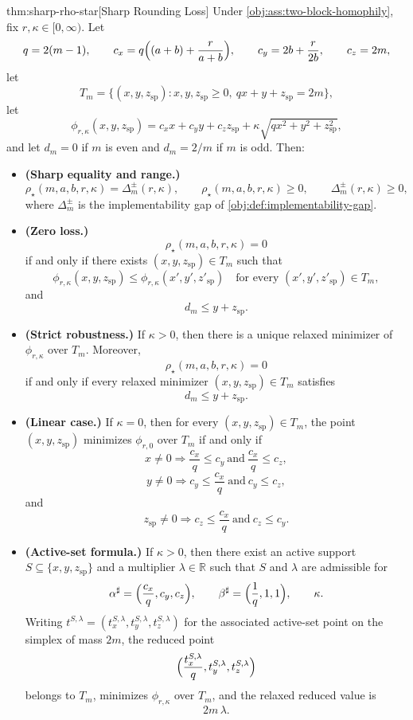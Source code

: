 \begin{theoremv}{thm:sharp-rho-star}[Sharp Rounding Loss]
Under \cref{obj:ass:two-block-homophily}, fix $r,\kappa\in[0,\infty)$.  Let
\[
q=2(m-1),\qquad
c_x=q\Bigl((a+b)+\frac{r}{a+b}\Bigr),\qquad
c_y=2b+\frac{r}{2b},\qquad
c_z=2m,
\]
let
\[
T_m=\{(x,y,z_{\mathrm{sp}}):x,y,z_{\mathrm{sp}}\ge0,\ qx+y+z_{\mathrm{sp}}=2m\},
\]
let
\[
\phi_{r,\kappa}(x,y,z_{\mathrm{sp}})
=c_xx+c_yy+c_zz_{\mathrm{sp}}
+\kappa\sqrt{qx^2+y^2+z_{\mathrm{sp}}^2},
\]
and let $d_m=0$ if $m$ is even and $d_m=2/m$ if $m$ is odd.  Then:
\begin{itemize}
\item \textbf{(Sharp equality and range.)}
\[
\rho_\star(m,a,b,r,\kappa)=\Delta_m^{\pm}(r,\kappa),
\qquad
\rho_\star(m,a,b,r,\kappa)\ge0,
\qquad
\Delta_m^{\pm}(r,\kappa)\ge0,
\]
where $\Delta_m^{\pm}$ is the implementability gap of \cref{obj:def:implementability-gap}.

\item \textbf{(Zero loss.)}
\[
\rho_\star(m,a,b,r,\kappa)=0
\]
if and only if there exists $(x,y,z_{\mathrm{sp}})\in T_m$ such that
\[
\phi_{r,\kappa}(x,y,z_{\mathrm{sp}})
\le
\phi_{r,\kappa}(x',y',z'_{\mathrm{sp}})
\quad\text{for every }(x',y',z'_{\mathrm{sp}})\in T_m,
\]
and
\[
d_m\le y+z_{\mathrm{sp}}.
\]

\item \textbf{(Strict robustness.)}
If $\kappa>0$, then there is a unique relaxed minimizer of $\phi_{r,\kappa}$ over $T_m$.  Moreover,
\[
\rho_\star(m,a,b,r,\kappa)=0
\]
if and only if every relaxed minimizer $(x,y,z_{\mathrm{sp}})\in T_m$ satisfies
\[
d_m\le y+z_{\mathrm{sp}}.
\]

\item \textbf{(Linear case.)}
If $\kappa=0$, then for every $(x,y,z_{\mathrm{sp}})\in T_m$, the point $(x,y,z_{\mathrm{sp}})$ minimizes $\phi_{r,0}$ over $T_m$ if and only if
\[
x\ne0\Rightarrow \frac{c_x}{q}\le c_y\ \text{and}\ \frac{c_x}{q}\le c_z,
\]
\[
y\ne0\Rightarrow c_y\le \frac{c_x}{q}\ \text{and}\ c_y\le c_z,
\]
and
\[
z_{\mathrm{sp}}\ne0\Rightarrow c_z\le \frac{c_x}{q}\ \text{and}\ c_z\le c_y.
\]

\item \textbf{(Active-set formula.)}
If $\kappa>0$, then there exist an active support $S\subseteq\{x,y,z_{\mathrm{sp}}\}$ and a multiplier $\lambda\in\mathbb R$ such that $S$ and $\lambda$ are admissible for
\[
\alpha^\sharp=\Bigl(\frac{c_x}{q},c_y,c_z\Bigr),
\qquad
\beta^\sharp=\Bigl(\frac1q,1,1\Bigr),
\qquad
\kappa.
\]
Writing $t^{S,\lambda}=(t_x^{S,\lambda},t_y^{S,\lambda},t_z^{S,\lambda})$ for the associated active-set point on the simplex of mass $2m$, the reduced point
\[
\Bigl(\frac{t_x^{S,\lambda}}{q},t_y^{S,\lambda},t_z^{S,\lambda}\Bigr)
\]
belongs to $T_m$, minimizes $\phi_{r,\kappa}$ over $T_m$, and the relaxed reduced value is
\[
2m\,\lambda.
\]


\end{itemize}
\end{theoremv}
